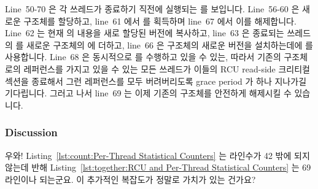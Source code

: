 Line~50-70 은 각 쓰레드가 종료하기 직전에 실행되는
 를 보입니다.
Line~56-60 은 새로운  구조체를 할당하고, line~61 에서
 를 획득하며 line~67 에서 이를 해제합니다.
Line~62 는 현재  의 내용을 새로 할당된 버전에 복사하고, line~63
은 종료되는 쓰레드의  를 새로운 구조체의  에 더하고,
line~66 은  구조체의 새로운 버전을 설치하는데에
 를 사용합니다.
Line~68 은 동시적으로  를 수행하고 있을 수 있는, 따라서 기존의
 구조체로의 레퍼런스를 가지고 있을 수 있는 모든 쓰레드가 이들의
RCU read-side 크리티컬 섹션을 종료해서 그런 레퍼런스를 모두 버려버리도록 grace
period 가 하나 지나가길 기다립니다.
그러고 나서 line~69 는 이제 기존의  구조체를 안전하게 해제시킬
수 있습니다.
\iffalse

Lines~50-70 shows \co{count_unregister_thread()}, which is invoked
by each thread just before it exits.
Lines~56-60 allocate a new \co{countarray} structure,
line~61 acquires \co{final_mutex} and line~67 releases it.
Line~62 copies the contents of the current \co{countarray} into
the newly allocated version, line~63 adds the exiting thread's \co{counter}
to new structure's \co{->total}, and line~64 \co{NULL}s the exiting thread's
\co{counterp[]} array element.
Line~65 then retains a pointer to the current (soon to be old)
\co{countarray} structure, and line~66 uses \co{rcu_assign_pointer()}
to install the new version of the \co{countarray} structure.
Line~68 waits for a grace period to elapse, so that any threads that
might be concurrently executing in \co{read_count()}, and thus might
have references to the old \co{countarray} structure, will be allowed
to exit their RCU read-side critical sections, thus dropping any such
references.
Line~69 can then safely free the old \co{countarray} structure.
\fi

\subsubsection{Discussion}

\QuickQuiz{}
	우와!
	Listing~\ref{lst:count:Per-Thread Statistical Counters} 는 라인수가 42
	밖에 되지 않는데 반해
	Listing~\ref{lst:together:RCU and Per-Thread Statistical Counters}
	는 69 라인이나 되는군요.
	이 추가적인 복잡도가 정말로 가치가 있는 건가요?
	\iffalse

